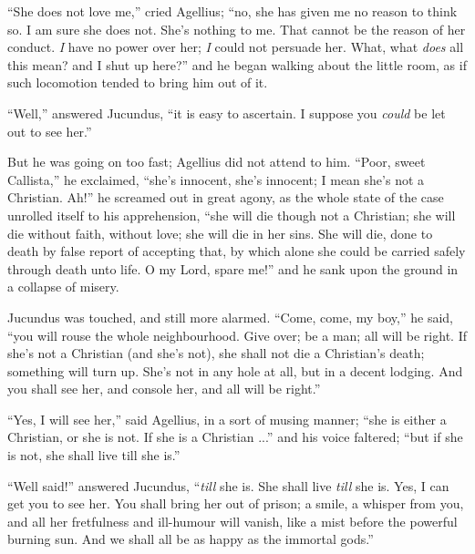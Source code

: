 ``She does not love me,'' cried Agellius; ``no, she has
given me no reason to think so. I am sure she does not. She's nothing
to me. That cannot be the reason of her conduct. \emph{I} have no
power over her; \emph{I} could not persuade her. What, what \emph{does}
all this mean? and I shut up here?'' and he began walking about
the little room, as if such locomotion tended to bring him out of it.

``Well,'' answered Jucundus, ``it is easy to ascertain.
I suppose you \emph{could} be let out to see her.''

But he was going on too fast; Agellius did not attend to him.
``Poor, sweet Callista,'' he exclaimed, ``she's innocent,
she's innocent; I mean she's not a Christian. Ah!'' he screamed
out in great agony, as the whole state of the case unrolled itself to
his apprehension, ``she will die though not a Christian; she will
die without faith, without love; she will die in her sins. She
will die, done to death by false report of accepting that, by which
alone she could be carried safely through death unto life. O my Lord,
spare me!'' and he sank upon the ground in a collapse of misery.

Jucundus was touched, and still more alarmed. ``Come, come, my
boy,'' he said, ``you will rouse the whole neighbourhood. Give
over; be a man; all will be right. If she's not a Christian (and she's
not), she shall not die a Christian's death; something will turn up.
She's not in any hole at all, but in a decent lodging. And you shall
see her, and console her, and all will be right.''

``Yes, I will see her,'' said Agellius, in a sort of musing
manner; ``she is either a Christian, or she is not. If she is a
Christian ...'' and his voice faltered; ``but if she is not,
she shall live till she is.''

``Well said!'' answered Jucundus, ``\emph{till} she is.
She shall live \emph{till} she is. Yes, I can get you to see her. You
shall bring her out of prison; a smile, a whisper from you, and all
her fretfulness and ill-humour will vanish, like a mist before the
powerful burning sun. And we shall all be as happy as the immortal
gods.''

